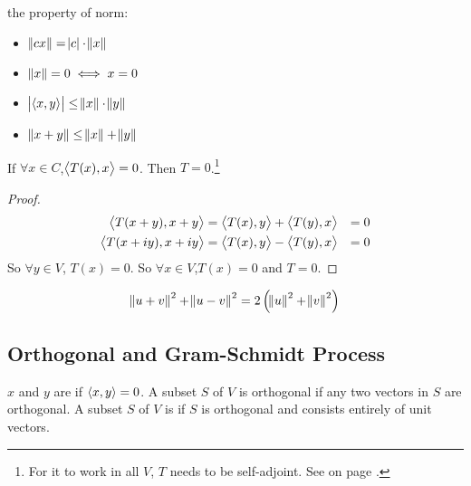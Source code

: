 \begin{theorem}
	the property of norm:
	\begin{itemize}
		\item $\norm{cx} = \abs{c} \cdot \norm{x}$
		\item $\norm{x} = 0 \iff x = 0$
		\item {} $\abs{\left\langle \displaystyle x, y \right\rangle} \leq \norm{x} \cdot \norm{y}$
		\item {} $\norm{x+y} \leq \norm{x} + \norm{y}$
	\end{itemize}
\end{theorem}

\begin{theorem}\label{zerotforalltx}
    If $\forall x \in C$,$\left\langle \displaystyle T(x), x \right\rangle = 0$. Then $T = 0$.\footnote{For it to work in all $V$, $T$ needs to be self-adjoint. See  on page \pageref{zerotforalltxforselfadjoint}.}
\end{theorem}
\begin{proof}
    \begin{equation*}
        \begin{aligned}
            \left\langle \displaystyle T(x+y), x+y \right\rangle &= \left\langle \displaystyle T(x), y \right\rangle + \left\langle \displaystyle T(y), x \right\rangle  &= 0 \\
            \left\langle \displaystyle T(x+iy), x+iy \right\rangle &= \left\langle \displaystyle T(x), y \right\rangle -\left\langle \displaystyle T(y), x \right\rangle &= 0            
        \end{aligned}
    \end{equation*}
    So $\forall y \in V$, $T(x) = 0$. So $\forall x \in V$,$T(x) = 0$ and $T = 0$.
\end{proof}

\begin{theorem}
    \begin{equation}
        \norm{u+v}^2 + \norm{u-v}^2 = 2 \left(\norm{u}^2 + \norm{v}^2 \right)
    \end{equation}    
\end{theorem}





\subsection{Orthogonal and Gram-Schmidt Process}

\begin{definition}
	$x$ and $y$ are  if $\left\langle \displaystyle x, y \right\rangle = 0$. A subset $S$ of $V$ is orthogonal if any two vectors in $S$ are orthogonal. A subset $S$ of $V$ is  if $S$ is orthogonal and consists entirely of unit vectors.
\end{definition}

